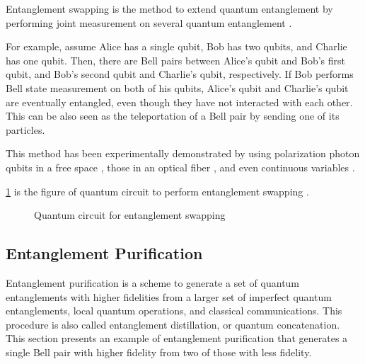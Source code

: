 Entanglement swapping is the method to extend quantum entanglement by performing joint measurement on several quantum entanglement \cite{zukowski1993event}.

For example, assume Alice has a single qubit, Bob has two qubits, and Charlie has one qubit. Then, there are Bell pairs between Alice's qubit and Bob's first qubit, and Bob's second qubit and Charlie's qubit, respectively.
If Bob performs Bell state measurement on both of his qubits, Alice's qubit and Charlie's qubit are eventually entangled, even though they have not interacted with each other.
This can be also seen as the teleportation of a Bell pair by sending one of its particles. 

This method has been experimentally demonstrated by using polarization photon qubits in a free space \cite{PhysRevLett.80.3891},  those in an optical fiber \cite{PhysRevA.71.050302}, and even continuous variables \cite{jia2004experimental}.

\ref{background:entanglement-swapping} is the figure of quantum circuit to perform entanglement swapping \cite{9803043}.

\begin{figure}[ht]
  \begin{center}
\caption{Quantum circuit for entanglement swapping}
\end{center}
\label{background:entanglement-swapping}
\end{figure}

\subsection{Entanglement Purification}

Entanglement purification \cite{PhysRevA.53.2046} is a scheme to generate a set of quantum entanglements with higher fidelities from a larger set of imperfect quantum entanglements, local quantum operations, and classical communications.
This procedure is also called entanglement distillation, or quantum concatenation. This section presents an example of entanglement purification that generates a single Bell pair with higher fidelity from two of those with less fidelity.

